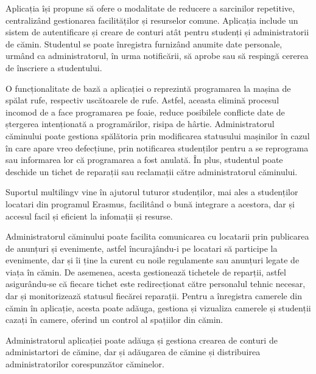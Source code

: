 \documentclass[12pt,a4paper]{report}
\theoremstyle{definition}
\theoremstyle{remark}
\begin{document}
\par Aplicația își propune să ofere o modalitate de reducere a sarcinilor repetitive, centralizând gestionarea facilităților și resurselor comune. Aplicația include un sistem de autentificare și creare de conturi atât pentru studenți și administratorii de cămin. Studentul se poate înregistra furnizând anumite date personale, urmând ca administratorul, în urma notificării, să aprobe sau să respingă cererea de înscriere a studentului. 
\par O funcționalitate de bază a aplicației o reprezintă programarea la mașina de spălat rufe, respectiv uscătoarele de rufe. Astfel, aceasta elimină procesul incomod de a face programarea pe foaie, reduce posibilele conflicte date de ștergerea intenționată a programărilor, risipa de hârtie. Administratorul căminului poate gestiona spălătoria prin modificarea statusului mașinilor în cazul în care apare vreo defecțiune, prin notificarea studenților pentru a se reprograma sau informarea lor că programarea a fost anulată. În plus, studentul poate deschide un tichet de reparații sau reclamații către administratorul căminului.
\par Suportul multilingv vine în ajutorul tuturor studenților, mai ales a studenților locatari din programul Erasmus, facilitând o bună integrare a acestora, dar și accesul facil și eficient la infomații și resurse.
\par Administratorul căminului poate facilita comunicarea cu locatarii prin publicarea de anunțuri și evenimente, astfel încurajându-i pe locatari să participe la evenimente, dar și îi ține la curent cu noile regulamente sau anunțuri legate de viața în cămin.
De asemenea, acesta gestionează tichetele de reparții, astfel asigurându-se că fiecare tichet este redirecționat către personalul tehnic necesar, dar și monitorizează statusul fiecărei reparații. Pentru a înregistra camerele din cămin în aplicație, acesta poate adăuga, gestiona și vizualiza camerele și studenții cazați în camere, oferind un control al spațiilor din cămin.
\par Administratorul aplicației poate adăuga și gestiona crearea de conturi de administartori de cămine, dar și adăugarea de cămine și distribuirea administratorilor corespunzător căminelor.
\end{document}
